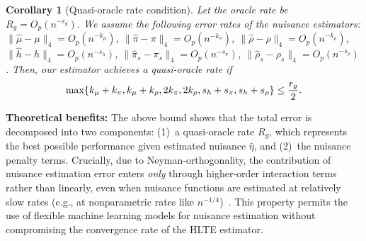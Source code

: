 \documentclass{article}
\theoremstyle{plain}
\newtheorem{corollary}[theorem]{Corollary}
\theoremstyle{definition}
\theoremstyle{remark}
\newcommand{\1}{\mathds{1}}                %
\begin{document}
\begin{corollary}[Quasi-oracle rate condition]
    Let the oracle rate be $R_g = O_p(n^{-r_g})$. We assume the following error rates of the nuisance estimators:
        $\|\hat\mu-\mu\|_4 =O_p(n^{-k_\mu})$, 
        $\|\hat\pi-\pi\|_4 = O_p(n^{-k_\pi})$, 
        $\|\hat\rho-\rho\|_4 = O_p(n^{-k_\rho})$,
        $\|\hat{h}-h\|_4 =O_p(n^{-s_h})$,
        $\|\hat\pi_s-\pi_s\|_4 = O_p(n^{-s_\pi})$, 
        $\|\hat\rho_s-\rho_s\|_4 = O_p(n^{-s_\rho})$.
    Then, our estimator achieves a quasi-oracle rate if
    \begin{align}
        \max \{ k_\mu+k_\pi, k_\mu+k_\rho, 2k_\pi,2k_\rho, s_h+s_\pi,s_h+s_\rho \} \leq \frac{r_g}{2}. \notag
    \end{align}
\end{corollary}
\textbf{Theoretical benefits:} The above bound shows that the total error is decomposed into two components: (1)~a quasi-oracle rate $R_g$, which represents the best possible performance given estimated nuisance $\hat\eta$, and (2)~the nuisance penalty terms. Crucially, due to Neyman-orthogonality, the contribution of nuisance estimation error enters \textit{only} through higher-order interaction terms rather than linearly, even when nuisance functions are estimated at relatively slow rates (e.g., at nonparametric rates like $n^{-1/4}$)~\cite{Chernozhukov.2018, Foster.2023}. This property permits the use of flexible machine learning models for nuisance estimation without compromising the convergence rate of the HLTE estimator.
\end{document}
